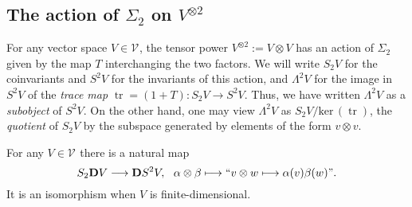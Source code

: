 \documentclass[11pt]{amsart} \renewcommand{\baselinestretch}{1.2}
\theoremstyle{plain}
\theoremstyle{definition}
\renewcommand{\ker}{\mathrm{ker}\,}
\DeclareMathOperator{\trace}{tr}
\renewcommand{\to}{\longrightarrow}
\newcommand{\calV}{\mathcal{V}}
\newcommand{\vect}[2]{\calV^{#1}_{#2}}
\newcommand{\dual}{\mathbf{D}}
\renewcommand{\mapsto}{\longmapsto}
\begin{document}
\begin{Conventions and notation}
\subsection{The action of $\Sigma_2$ on $V^{\otimes 2}$}
For any vector space $V\in \vect{}{}$, the tensor power $V^{\otimes2}:=V\otimes V$ has an action of $\Sigma_2$ given by the map $T$ interchanging the two factors. We will write $S_2V$ for the coinvariants and $S^2V$ for the invariants of this action, and $\Lambda^2V$ for the image in $S^2V$ of the \emph{trace map} $\trace=(1+T):S_2V\to S^2V$. Thus, we have written $\Lambda^2V$ as a \emph{subobject} of $S^2V$.
On the other hand, one may view $\Lambda^2V$ as $S_2V/\ker(\trace)$,  the \emph{quotient} of $S_2V$ by the subspace generated by elements of the form $v\otimes v$. %

For any $V\in \vect{}{}$ there is a natural map
\[S_2\dual V\to \dual S^2V,\ \ \alpha\otimes \beta\mapsto\textup{``$v\otimes w\mapsto \alpha(v)\beta(w)$''}.\]
It is an isomorphism when $V$ is finite-dimensional.


\end{Conventions and notation}
\end{document}
